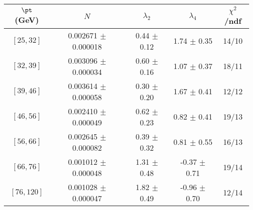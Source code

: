 \begin{tabular}{c||c|c|c|c}
$\pt$ (GeV) & $N$ & $\lambda_{2}$ & $\lambda_4$  & $\chi^2$/ndf  \\
\hline
$[25, 32]$ & 0.002671 $\pm$ 0.000018 & 0.44 $\pm$ 0.12 & 1.74 $\pm$ 0.35 & 14/10\\
$[32, 39]$ & 0.003096 $\pm$ 0.000034 & 0.60 $\pm$ 0.16 & 1.07 $\pm$ 0.37 & 18/11\\
$[39, 46]$ & 0.003614 $\pm$ 0.000058 & 0.30 $\pm$ 0.20 & 1.67 $\pm$ 0.41 & 12/12\\
$[46, 56]$ & 0.002410 $\pm$ 0.000049 & 0.62 $\pm$ 0.23 & 0.82 $\pm$ 0.41 & 19/13\\
$[56, 66]$ & 0.002645 $\pm$ 0.000082 & 0.39 $\pm$ 0.32 & 0.81 $\pm$ 0.55 & 16/13\\
$[66, 76]$ & 0.001012 $\pm$ 0.000048 & 1.31 $\pm$ 0.48 & -0.37 $\pm$ 0.71 & 19/14\\
$[76, 120]$ & 0.001028 $\pm$ 0.000047 & 1.82 $\pm$ 0.49 & -0.96 $\pm$ 0.70 & 12/14\\
\end{tabular}
